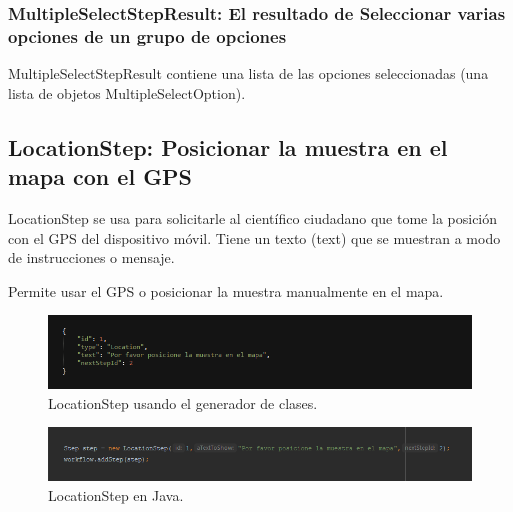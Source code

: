 \subsubsection{MultipleSelectStepResult: El resultado de Seleccionar varias opciones de un grupo de opciones}
MultipleSelectStepResult contiene una lista de las opciones seleccionadas (una lista de objetos MultipleSelectOption).





\subsection{LocationStep: Posicionar la muestra en el mapa con el GPS}
LocationStep se usa para solicitarle al científico ciudadano que tome la posición con el GPS del dispositivo móvil. Tiene un texto (text) que se muestran a modo de instrucciones o mensaje. 

Permite usar el GPS o posicionar la muestra manualmente en el mapa.

\begin{figure}[H]
  \centering
    \includegraphics[scale=0.6]{50-anexos/C-steps/location_json.png} 
    \caption{LocationStep usando el generador de clases.}
\end{figure}	

\begin{figure}[H]
  \centering
    \includegraphics[scale=0.6]{50-anexos/C-steps/location_java.png} 
    \caption{LocationStep en Java.}
\end{figure}

